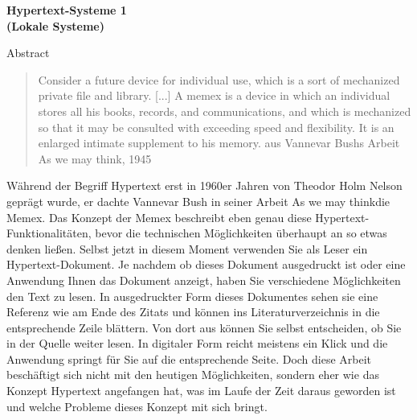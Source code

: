 \begin{centering}
\textbf { \LARGE
Hypertext-Systeme 1
\\(Lokale Systeme)
\\[1.2cm]
}
\end{centering}

{\large
Abstract
}

{

\begin{quote}
	\glqq Consider a future device for individual use, which is a sort of mechanized private file and library. [...] A memex is a device in which an individual stores all his books, records, and communications, and which is mechanized so that it may be consulted with exceeding speed and flexibility. It is an enlarged intimate supplement to his memory.\grqq{ } aus Vannevar Bushs Arbeit \glqq As we may think\grqq{ }, 1945\cite{Bush1945}
\end{quote}

Während der Begriff \glqq Hypertext\grqq{ } erst in 1960er Jahren von Theodor Holm Nelson \cite{Nelson1965} geprägt wurde, er dachte Vannevar Bush in seiner Arbeit \glqq As we may think\grqq{ }die Memex. Das Konzept der Memex beschreibt eben genau diese Hypertext-Funktionalitäten, bevor die technischen Möglichkeiten überhaupt an so etwas denken ließen. Selbst jetzt in diesem Moment verwenden Sie als Leser ein Hypertext-Dokument. Je nachdem ob dieses Dokument ausgedruckt ist oder eine Anwendung Ihnen das Dokument anzeigt, haben Sie verschiedene Möglichkeiten den Text zu lesen. In ausgedruckter Form dieses Dokumentes sehen sie eine Referenz wie am Ende des Zitats und können ins Literaturverzeichnis in die entsprechende Zeile blättern. Von dort aus können Sie selbst entscheiden, ob Sie in der Quelle weiter lesen. In digitaler Form reicht meistens ein Klick und die Anwendung springt für Sie auf die entsprechende Seite. Doch diese Arbeit beschäftigt sich nicht mit den heutigen Möglichkeiten, sondern eher wie das Konzept Hypertext angefangen hat, was im Laufe der Zeit daraus geworden ist und welche Probleme dieses Konzept mit sich bringt.

}
